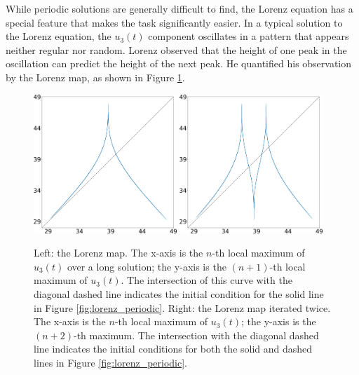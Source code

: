 While periodic solutions are generally difficult to find,
the Lorenz equation has a special feature that makes the task significantly
easier.  In a typical solution to the Lorenz equation, the 
$u_3(t)$ component oscillates in a pattern that appears neither regular nor random.  Lorenz
observed that the height of one peak in the oscillation can predict the height of the next peak.  He quantified his observation by the Lorenz map,
as shown in Figure \ref{fig:lorenz_map}.

\begin{figure}[H]\centering
\includegraphics[width=0.48\textwidth]{figure/lorenz_zmax_10_28_2.6666666666666665.png}
\hspace{0.02\textwidth}
\includegraphics[width=0.48\textwidth]{figure/lorenz_zmax2_10_28_2.6666666666666665.png}
\caption{Left: the Lorenz map.  The x-axis is the $n$-th local maximum of $u_3(t)$ over a
long solution; the y-axis is the $(n+1)$-th local maximum of $u_3(t)$.  The intersection of this curve
with the diagonal dashed line indicates the initial condition for the solid line
in Figure \ref{fig:lorenz_periodic}.
Right: the Lorenz map iterated twice.  The x-axis is the $n$-th local maximum
of $u_3(t)$; the y-axis is the $(n+2)$-th maximum.  The intersection with the diagonal dashed
line indicates the initial conditions for both the solid and dashed lines in
Figure \ref{fig:lorenz_periodic}. }
\label{fig:lorenz_map}
\end{figure}


